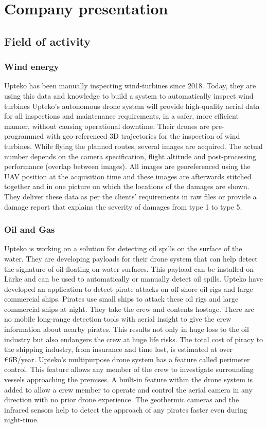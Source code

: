 \chapter{Company presentation}

\section{Field of activity}
\subsection{Wind energy}
Upteko has been manually inspecting wind-turbines since 2018. Today, they are using this data and knowledge to build a system to automatically inspect wind turbines
Upteko's autonomous drone system will provide high-quality aerial data for all inspections and maintenance requirements, in a safer, more efficient manner, without causing operational downtime.
Their drones are pre-programmed with geo-referenced 3D trajectories for the inspection of wind turbines. While flying the planned routes, several images are acquired. The actual number depends on the camera specification, flight altitude and post-processing performance (overlap between images). All images are georeferenced using the UAV position at the acquisition time and these images are afterwards stitched together and in one picture on which the locations of the damages are shown.
They deliver these data as per the clients' requirements in raw files or provide a damage report that explains the severity of damages from type 1 to type 5.

\subsection{Oil and Gas}
Upteko is working on a solution for detecting oil spills on the surface of the water. They are developing payloads for their drone system that can help detect the signature of oil floating on water surfaces. This payload can be installed on Lärke and can be used to automatically or manually detect oil spills.
Upteko have developed an application to detect pirate attacks on off-shore oil rigs and large commercial ships. Pirates use small ships to attack these oil rigs and large commercial ships at night. They take the crew and contents hostage. There are no mobile long-range detection tools with aerial insight to give the crew information about nearby pirates. This results not only in huge loss to the oil industry but also endangers the crew at huge life risks.
The total cost of piracy to the shipping industry, from insurance and time lost, is estimated at over €6B/year.
Upteko's multipurpose drone system has a feature called perimeter control. This feature allows any member of the crew to investigate surrounding vessels approaching the premises. A built-in feature within the drone system is added to allow a crew member to operate and control the aerial camera in any direction with no prior drone experience. The geothermic cameras and the infrared sensors help to detect the approach of any pirates faster even during night-time.

